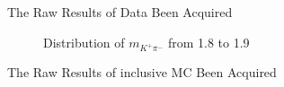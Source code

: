 \documentclass{beamer}
\begin{document}
\begin{frame}{The Raw Results of Data Been Acquired}
\begin{figure}[!t]
\centering
{}
\label{fig1.}
\caption{Distribution of $m_{K^+ \pi^-}$ from 0.4 to 4.5}
\label{fig2.}
\caption{Distribution of $m_{K^+ \pi^-}$ from 0.4 to 2.5}
\label{fig3.}
\caption{Distribution of $m_{K^+ \pi^-}$ from 1.8 to 1.9}
\end{figure}
\end{frame}

\begin{frame}{The Raw Results of inclusive MC Been Acquired}
\end{frame}
\end{document}

